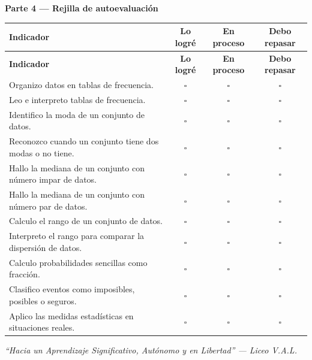 \documentclass[12pt, letterpaper]{article}
\begin{document}
	\vspace{0.5cm}
	\noindent\textbf{Parte 4 — Rejilla de autoevaluación}
	
	\vspace{0.3cm}
	\renewcommand{\arraystretch}{1.65}
	\begin{center}
		\begin{longtable}{|m{8.5cm}|c|c|c|}
			\hline
			\rowcolor{valdark!80}
			\color{white}\textbf{Indicador} &
			\color{white}\textbf{Lo logré} &
			\color{white}\textbf{En proceso} &
			\color{white}\textbf{Debo repasar} \\
			\hline
			\endfirsthead
			\hline
			\rowcolor{valdark!80}
			\color{white}\textbf{Indicador} &
			\color{white}\textbf{Lo logré} &
			\color{white}\textbf{En proceso} &
			\color{white}\textbf{Debo repasar} \\
			\hline
			\endhead
			\hline
			\endlastfoot
			Organizo datos en tablas de frecuencia.
			& $\square$ & $\square$ & $\square$ \\
			\hline
			Leo e interpreto tablas de frecuencia.
			& $\square$ & $\square$ & $\square$ \\
			\hline
			Identifico la moda de un conjunto de datos.
			& $\square$ & $\square$ & $\square$ \\
			\hline
			Reconozco cuando un conjunto tiene dos modas o no tiene.
			& $\square$ & $\square$ & $\square$ \\
			\hline
			Hallo la mediana de un conjunto con número impar de datos.
			& $\square$ & $\square$ & $\square$ \\
			\hline
			Hallo la mediana de un conjunto con número par de datos.
			& $\square$ & $\square$ & $\square$ \\
			\hline
			Calculo el rango de un conjunto de datos.
			& $\square$ & $\square$ & $\square$ \\
			\hline
			Interpreto el rango para comparar la dispersión de datos.
			& $\square$ & $\square$ & $\square$ \\
			\hline
			Calculo probabilidades sencillas como fracción.
			& $\square$ & $\square$ & $\square$ \\
			\hline
			Clasifico eventos como imposibles, posibles o seguros.
			& $\square$ & $\square$ & $\square$ \\
			\hline
			Aplico las medidas estadísticas en situaciones reales.
			& $\square$ & $\square$ & $\square$ \\
			\hline
		\end{longtable}
	\end{center}
	
	\vspace{0.6cm}
	\begin{center}
		\begin{tcolorbox}[colback=valblue!10, colframe=valblue,
			width=0.75\textwidth, arc=3mm, boxrule=1.5pt]
			\centering\itshape
			``Hacia un Aprendizaje Significativo,
			Autónomo y en Libertad'' --- Liceo V.A.L.
		\end{tcolorbox}
	\end{center}
	
\end{document}
